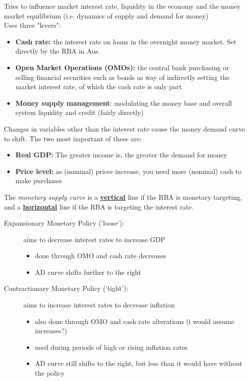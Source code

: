 \documentclass{article}
\begin{document}
Tries to influence market interest rate, liquidity in the economy and the money market equilibrium (i.e. dynamics of supply and demand for money)\\


Uses three "levers":
\begin{itemize}
\item \textbf{Cash rate:} the interest rate on loans in the overnight money market. Set directly by the RBA in Aus. 
\item \textbf{Open Market Operations (OMOs):} the central bank purchasing or selling financial securities such as bonds as way of indirectly setting the market interest rate, of which the cash rate is only part
\item \textbf{Money supply management}: modulating the money base and overall system liquidity and credit (fairly directly)
\end{itemize}
Changes in variables other than the interest rate cause the money demand curve to shift. The two most important of these are:
\begin{itemize}
\item \textbf{Real GDP:} The greater income is, the greater the demand for money
\item \textbf{Price level:} as (nominal) prices increase, you need more (nominal) cash to make purchases
\end{itemize}

The \textit{monetary supply curve} is a \underline{\textbf{vertical}} line if the RBA is monetary targeting, and a \underline{\textbf{horizontal}} line if the RBA is targeting the interest rate. 

\begin{description}
\item[Expansionary Monetary Policy ('loose'):] aims to decrease interest rates to increase GDP 
  \begin{itemize}
  \item done through OMO and cash rate decreases
  \item AD curve shifts further to the right
  \end{itemize}
  
\item[Contractionary Monetary Policy ('tight'):] aims to increase interest rates to decrease inflation
  \begin{itemize}
  \item also done through OMO and cash rate alterations (i would assume increases?)
  \item used during periods of high or rising inflation rates
  \item AD curve still shifts to the right, but less than it would have without the policy
  \end{itemize}
\end{description}
\end{document}
